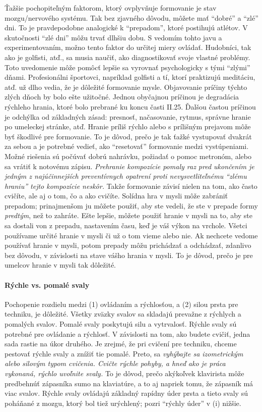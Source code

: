 Ťažšie pochopiteľným faktorom, ktorý ovplyvňuje formovanie je stav mozgu/nervového systému. Tak bez zjavného dôvodu, môžete mať “dobré” a “zlé” dni. To je pravdepodobne analogické k “prepadom”, ktoré postihujú atlétov. V skutočnosti “zlé dni” môžu trvať dlhšiu dobu. S vedomím tohto javu a experimentovaním, možno tento faktor do určitej miery ovládať. Hudobníci, tak ako je golfisti, atď., sa musia naučiť, ako diagnostikovať svoje vlastné problémy. Toto uvedomenie môže pomôcť lepšie sa vyrovnať psychologicky s tými “zlými” dňami. Profesionálni športovci, napríklad golfisti a tí, ktorí praktizujú meditáciu, atď. už dlho vedia, že je dôležité formovanie mysle. Objavovanie príčiny týchto zlých dňoch by bolo ešte užitočné. Jednou obyčajnou príčinou je degradácia rýchleho hrania, ktoré bolo prebrané ku koncu časti II.25. Ďalšou častou príčinou je odchýlka od základných zásad: presnosť, načasovanie, rytmus, správne hranie po umeleckej stránke, atď. Hranie príliš rýchlo alebo s prílišným prejavom môže byť škodlivé pre formovanie. To je dôvod, prečo je tak ťažké vystupovať dvakrát za sebou a je potrebné vedieť, ako “resetovať” formovanie medzi vystúpeniami. Možné riešenia sú počúvať dobrú nahrávku, požiadať o pomoc metronóm, alebo sa vrátiť k notovému zápisu. \emph{Prehranie kompozície pomaly raz pred ukončením je jedným z najúčinnejších preventívnych opatrení proti nevysvetliteľnému “zlému hraniu” tejto kompozície neskôr.} Takže formovanie závisí nielen na tom, ako často cvičíte, ale aj o tom, čo a ako cvičíte. Solídna hra v mysli môže zabrániť prepadom; prinajmenšom ju môžete použiť, aby ste vedeli, že ste v prepade formy \textit{predtým}, než to zahráte. Ešte lepšie, môžete použiť hranie v mysli na to, aby ste sa dostali von z prepadu, nastavením času, keď je váš výkon na vrchole. Všetci používame určité hranie v mysli či už o tom vieme alebo nie. Ak nechcete vedome používať hranie v mysli, potom prepady môžu prichádzať a odchádzať, zdanlivo bez dôvodu, v závislosti na stave vášho hrania v mysli. To je dôvod, prečo je pre umelcov hranie v mysli tak dôležité.

\paragraph{Rýchle vs. pomalé svaly} Pochopenie rozdielu medzi (1) ovládaním a rýchlosťou, a (2) silou prsta pre techniku, je dôležité. Všetky zväzky svalov sa skladajú prevažne z rýchlych a pomalých svalov. Pomalé svaly poskytujú silu a vytrvalosť. Rýchle svaly sú potrebné pre ovládanie a rýchlosť. V závislosti na tom, ako budete cvičiť, jedna sada rastie na úkor druhého. Je zrejmé, že pri cvičení pre techniku, chceme pestovať rýchle svaly a znížiť tie pomalé. Preto, sa \emph{vyhýbajte sa izometrickým alebo silovým typom cvičenia. Cvičte rýchle pohyby, a hneď ako je práca vykonaná, rýchlo uvoľnite svaly.} To je dôvod, prečo akýkoľvek klavirista môže predbehnúť zápasníka sumo na klaviatúre, a to aj napriek tomu, že zápasník má viac svalov. Rýchle svaly ovládajú základný rapídny úder prsta a tieto svaly sú poháňané z mozgu, ktorý bol tiež urýchlený; pozri “rýchly úder” v (i) nižšie.

